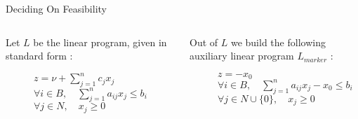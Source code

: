 \documentclass[32pt, aspectratio = 169]{beamer}
\begin{document}
\begin{frame}{Deciding On Feasibility}
    \begin{columns}[T]
        \begin{column}{.5\textwidth}
            Let $L$ be the linear program, given in standard form :
            \begin{figure}
            \begin{linearProgG}{
                ${\displaystyle z = \nu + \sum_{j=1}^n c_jx_j}$
                }{
                ${\displaystyle \forall i \in B, \quad \sum_{j=1}^n a_{ij}x_j \leq b_i}$
                }{
                $\forall j \in N, \quad x_j \geq 0$
                }
            \end{linearProgG}
            \end{figure}
        \end{column}
        \begin{column}{.55\textwidth}
            \begin{tcolorbox}[
                enhanced,
                parbox = true,
                colback = mLightBrown!30!white,
                colframe = mLightBrown!30!white,
                arc = 0mm,
                ]
                Out of $L$ we build the following auxiliary linear program $L_{marker}$ :
                \begin{figure}
                    \begin{linearProgG}{
                        ${\displaystyle z = - x_0}$
                        }{
                        ${\displaystyle \forall i \in B, \quad \sum_{j=1}^n a_{ij}x_j - x_0\leq b_i}$
                        }{
                        $\forall j \in N\cup \{0\}, \quad x_j \geq 0$
                        }
                    \end{linearProgG}
                \end{figure}
            \end{tcolorbox}
        \end{column}
    \end{columns}
\end{frame}
\end{document}
